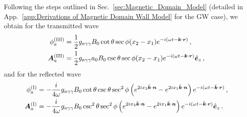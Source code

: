 \documentclass[a4paper,11pt]{article}
\begin{document}
Following the steps outlined in Sec.~\ref{sec:Magnetic_Domain_Model} (detailed in App.~\ref{app:Derivations of Magnetic Domain Wall Model} for the  GW case), we obtain for the transmitted wave
%
\begin{equation}
    \begin{aligned}
    \phi_{a}^{\rm (III)} & = \frac{1}{2} g_{a\gamma\gamma} B_{0} \cot \theta \sec \phi (x_{2} - x_{1} )  e^{- i (\omega t - \bm{k} \cdot \bm{r} ) } \,, \\
    \bm{A}_{a}^{\rm (III)} & = \frac{1}{2} g_{a\gamma\gamma} a_{0} B_{0} \csc \theta \sec \phi (x_{2} - x_{1})     e^{- i (\omega t - \bm{k} \cdot \bm{r} ) } \hat{\bm{e}}_{z} \,, 
    \end{aligned}
\end{equation}
%
and for the reflected wave
%
\begin{equation}
    \begin{aligned}
    \phi_{a}^{\rm (I)} & = - \frac{i}{4 \omega} g_{a\gamma\gamma} B_{0} \cot \theta  \csc \theta \sec^{2} \phi \left( e^{2 i x_{2}  \bar{\bm{k}} \cdot \bm{n} }  - e^{2 i x_{1} \bar{\bm{k}} \cdot \bm{n} }  \right)  e^{- i (\omega t - \bar{ \bm{k} } \cdot \bm{r} ) } \,, \\
    \bm{A}_{a}^{\rm (I)} & = - \frac{i}{4 \omega} g_{a\gamma\gamma} B_{0}  \csc^{2} \theta \sec^{2} \phi \left( e^{2 i x_{2}  \bar{\bm{k}} \cdot \bm{n} }  - e^{2 i x_{1} \bar{\bm{k}} \cdot \bm{n} }  \right)    e^{- i (\omega t - \bar{ \bm{k} } \cdot \bm{r} ) } \hat{\bm{e}}_{z} \,.
    \end{aligned}
\end{equation}
%
\end{document}
